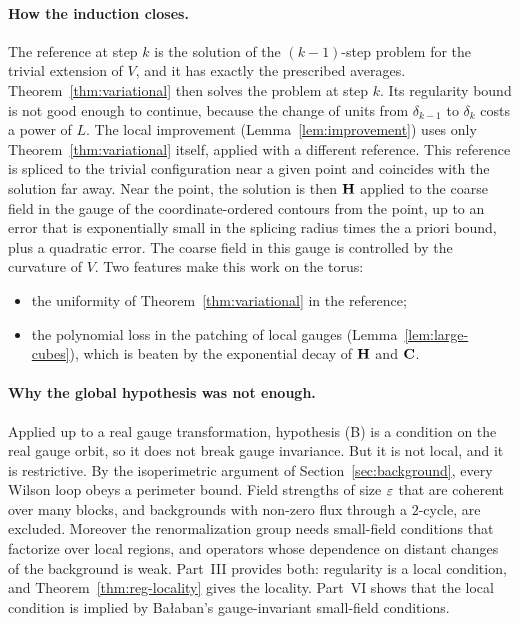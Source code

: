 \paragraph{How the induction closes.} The reference at step $k$ is the solution of the $(k-1)$-step problem for the trivial extension of $V$, and it has exactly the prescribed averages. Theorem~\ref{thm:variational} then solves the problem at step $k$. Its regularity bound is not good enough to continue, because the change of units from $\delta_{k-1}$ to $\delta_k$ costs a power of $L$. The local improvement (Lemma~\ref{lem:improvement}) uses only Theorem~\ref{thm:variational} itself, applied with a different reference. This reference is spliced to the trivial configuration near a given point and coincides with the solution far away. Near the point, the solution is then $\mathbf H$ applied to the coarse field in the gauge of the coordinate-ordered contours from the point, up to an error that is exponentially small in the splicing radius times the a priori bound, plus a quadratic error. The coarse field in this gauge is controlled by the curvature of $V$. Two features make this work on the torus:
\begin{itemize}
\item the uniformity of Theorem~\ref{thm:variational} in the reference;
\item the polynomial loss in the patching of local gauges (Lemma~\ref{lem:large-cubes}), which is beaten by the exponential decay of $\mathbf H$ and $\mathbf C$.
\end{itemize}

\paragraph{Why the global hypothesis was not enough.} Applied up to a real gauge transformation, hypothesis (B) is a condition on the real gauge orbit, so it does not break gauge invariance. But it is not local, and it is restrictive. By the isoperimetric argument of Section~\ref{sec:background}, every Wilson loop obeys a perimeter bound. Field strengths of size $\varepsilon$ that are coherent over many blocks, and backgrounds with non-zero flux through a $2$-cycle, are excluded. Moreover the renormalization group needs small-field conditions that factorize over local regions, and operators whose dependence on distant changes of the background is weak. Part~III provides both: regularity is a local condition, and Theorem~\ref{thm:reg-locality} gives the locality. Part~VI shows that the local condition is implied by Ba\l aban's gauge-invariant small-field conditions.

